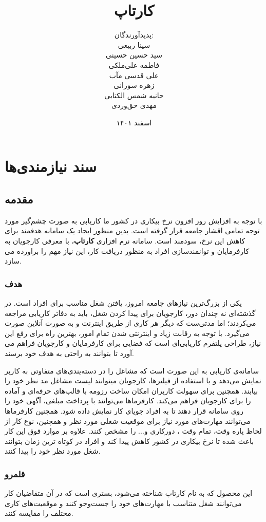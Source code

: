 \documentclass{report}
\title{
	{\Huge کارتاپ}
}
\author{
	پدید‌آورندگان: \\
	سینا ربیعی \\
	سید حسین حسینی \\
	فاطمه علی‌ملکی \\
	علی قدسی مآب \\
	زهره سورانی \\
	حانیه شمس الکتابی \\
	مهدی حق‌وردی
}
\date{اسفند ۱۴۰۱}
\begin{document}
	\renewcommand{\bibname}{مراجع}
	\maketitle
	\tableofcontents
		
	\chapter{سند نیازمندی‌ها}
		\section{مقدمه} 
			با توجه به افزایش روز افزون نرخ بیکاری در کشور ما کاریابی به صورت چشم‌گیر مورد توجه تمامی اقشار جامعه قرار گرفته است. بدین منظور ایجاد یک سامانه هدفمند برای کاهش این نرخ، سودمند است. سامانه نرم افزاری \textbf{کارتاپ}، با معرفی کارجویان به کارفرمایان و توانمندسازی افراد به منظور دریافت کار، این نیاز مهم را براورده می سازد.
			\subsection{هدف}
				یکی از بزرگ‌ترین نیازهای جامعه امروز، یافتن شغل مناسب برای افراد است. در گذشته‌ای نه چندان دور، کارجویان برای پیدا کردن شغل، باید به دفاتر کاریابی مراجعه می‌کردند؛ اما مدتی‌ست که دیگر هر کاری از طریق اینترنت و به صورت آنلاین صورت می‌گیرد. با توجه به رقابت زیاد و اینترنتی شدن تمام امور، بهترین راه برای رفع این نیاز، طراحی پلتفرم کاریابی‌‌ای است که فضایی برای کارفرمایان و کارجویان فراهم می آورد تا بتوانند به راحتی به هدف خود برسند.
				
				سامانه‌ی کاریابی به این صورت است که مشاغل را در دسته‌يندی‌های متفاوتی به کاربر نمایش می‌دهد و با استفاده از فیلترها، کارجویان میتوانند لیست مشاغل مد نظر خود را بیابند. همچنین برای سهولت کاربران امکان ساخت رزومه با قالب‌های حرفه‌ای و آماده را برای کارجویان فراهم می‌کند. کارفرما‌ها می‌توانند با پرداخت مبلغی، آگهی خود را روی سامانه قرار دهند تا به افراد جویای کار نمایش داده شود. همچنین کارفرماها می‌توانند مهارت‌های مورد نیاز برای موقعیت شغلی مورد نظر و همچنین، نوع کار از لحاظ پاره وقت، تمام وقت ، دورکاری و... را مشخص کنند.
				علاوه بر موارد فوق این کار باعث شده تا نرخ بیکاری در کشور کاهش پیدا کند و افراد در کوتاه ترین زمان بتوانند شغل مورد نظر خود را پیدا کنند.
				
			\subsection{قلمرو} 
				این محصول که به نام کارتاپ شناخته می‌شود، بستری است که در آن متقاضیان کار می‌توانند شغل متناسب با مهارت‌های خود را جست‌وجو کنند و موقعیت‌های کاری مختلف را مقایسه کنند.
				
\end{document}
